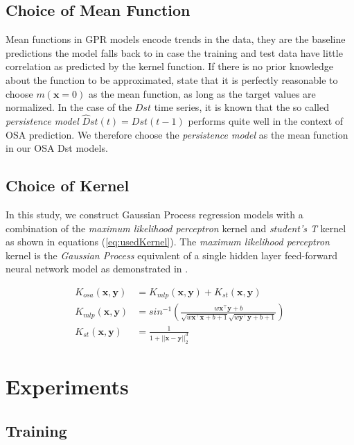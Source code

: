 \documentclass[sw, draft]{AGUTeX}
\begin{document}
\begin{article}
\subsection{Choice of Mean Function}

Mean functions in GPR models encode trends in the data, they are the baseline predictions the model falls back to in case the training and test data have little correlation as predicted by the kernel function. If there is no prior knowledge about the function to be approximated, \citet{Rasmussen:2005:GPM:1162254} state that it is perfectly reasonable to choose $m(\mathbf{x} = 0)$ as the mean function, as long as the target values are normalized. In the case of the $Dst$ time series, it is known that the so called \emph{persistence model} $\hat{D}st(t) = Dst(t-1)$ performs quite well in the context of OSA prediction. We therefore choose the \emph{persistence model} as the mean function in our OSA Dst models.

\subsection{Choice of Kernel}

In this study, we construct Gaussian Process regression models with a combination of the \emph{maximum likelihood perceptron} kernel and \emph{student's T} kernel as shown in equations (\ref{eq:usedKernel}). The \emph{maximum likelihood perceptron} kernel is the \emph{Gaussian Process} equivalent of a single hidden layer feed-forward neural network model as demonstrated in \citet{Neal:1996:BLN:525544}.

\begin{align}
    K_{osa}(\mathbf{x}, \mathbf{y}) & = K_{mlp}(\mathbf{x}, \mathbf{y}) + K_{st}(\mathbf{x}, \mathbf{y}) \label{eq:usedKernel} \\
    K_{mlp}(\mathbf{x}, \mathbf{y}) & = sin^{-1}(\frac{w\mathbf{x}^\intercal \mathbf{y} + b}{\sqrt{w\mathbf{x}^\intercal \mathbf{x} + b + 1} \sqrt{w\mathbf{y}^\intercal \mathbf{y} + b + 1}}) \\
    K_{st}(\mathbf{x}, \mathbf{y}) & = \frac{1}{1 + ||\mathbf{x} - \mathbf{y}||_{2}^d}
\end{align}

\section{Experiments} \label{sec:modeltraining}

\subsection*{Training}


\end{article}
\end{document}
